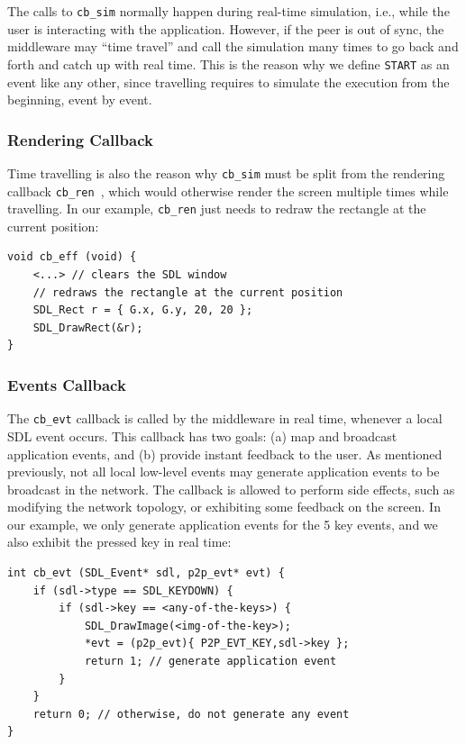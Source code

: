 \documentclass[10pt,journal,compsoc]{IEEEtran}
\newcommand{\code}[1]  {\texttt{\footnotesize{#1}}}
\begin{document}
The calls to \code{cb\_sim} normally happen during real-time simulation, i.e.,
while the user is interacting with the application.
However, if the peer is out of sync, the middleware may ``time travel'' and
call the simulation many times to go back and forth and catch up with real
time.
This is the reason why we define \code{START} as an event like any other, since
travelling requires to simulate the execution from the beginning, event by
event.

\subsubsection{Rendering Callback}
\label{sec.tml.api.cb_ren}

Time travelling is also the reason why \code{cb\_sim} must be split from the
rendering callback \code{cb\_ren}~\cite{tml.js}, which would otherwise render
the screen multiple times while travelling.
In our example, \code{cb\_ren} just needs to redraw the rectangle at the
current position:

{\footnotesize
\begin{verbatim}
void cb_eff (void) {
    <...> // clears the SDL window
    // redraws the rectangle at the current position
    SDL_Rect r = { G.x, G.y, 20, 20 };
    SDL_DrawRect(&r);
}
\end{verbatim}
}

\subsubsection{Events Callback}
\label{sec.tml.api.cb_evt}

The \code{cb\_evt} callback is called by the middleware in real time, whenever
a local SDL event occurs.
This callback has two goals:
    (a) map and broadcast application events, and
    (b) provide instant feedback to the user.
As mentioned previously, not all local low-level events may generate
application events to be broadcast in the network.
The callback is allowed to perform side effects, such as modifying the network
topology, or exhibiting some feedback on the screen.
In our example, we only generate application events for the 5 key events, and
we also exhibit the pressed key in real time:

{\footnotesize
\begin{verbatim}
int cb_evt (SDL_Event* sdl, p2p_evt* evt) {
    if (sdl->type == SDL_KEYDOWN) {
        if (sdl->key == <any-of-the-keys>) {
            SDL_DrawImage(<img-of-the-key>);
            *evt = (p2p_evt){ P2P_EVT_KEY,sdl->key };
            return 1; // generate application event
        }
    }
    return 0; // otherwise, do not generate any event
}
\end{verbatim}
}
\end{document}

